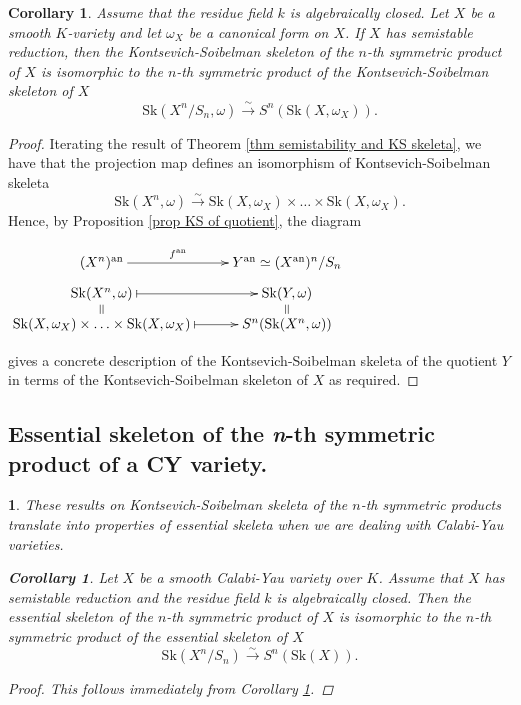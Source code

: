 \documentclass{amsart}%
\numberwithin{equation}{subsection}
\theoremstyle{plain2}
\newtheorem{cor}[equation]{Corollary}
\theoremstyle{definition2}
\theoremstyle{stepstyle}
\theoremstyle{point}
\theoremstyle{subpoint}
\newtheorem{subpoint}[equation]{}%
\newcommand{\spa}[1]{\begin{subpoint}#1\end{subpoint}}           %
\newcommand{\an}{\mathrm{an}}
\newcommand{\Sk}{\mathrm{Sk}}
\begin{document}
{\begin{cor}  \label{cor semistability and KS skeleta quotient}
Assume that the residue field $k$ is algebraically closed. Let $X$ be a smooth $K$-variety and let $\omega_X$ be a canonical form on $X$. If $X$ has semistable reduction, then the Kontsevich-Soibelman skeleton of the $n$-th symmetric product of $X$ is isomorphic to the $n$-th symmetric product of the Kontsevich-Soibelman skeleton of $X$ $$\Sk(X^n/S_n,\omega) \xrightarrow{\sim} S^n(\Sk(X,\omega_X)).$$
\end{cor}
\begin{proof}
Iterating the result of Theorem \ref{thm semistability and KS skeleta}, we have that the projection map defines an isomorphism of Kontsevich-Soibelman skeleta $$\Sk(X^n, \omega) \xrightarrow{\sim} \Sk(X,\omega_X) \times  \ldots \times \Sk(X,\omega_X).$$ Hence, by Proposition \ref{prop KS of quotient}, the diagram \begin{center}$
\xymatrixrowsep{0.5pc}\xymatrix{
(X^n)^\an \ar[r]^-{f^\an} & Y^\an \simeq (X^\an)^n/S_n \\
\Sk(X^n,\omega) \ar@{|->}[r] \ar@{=}[d] & \Sk(Y,\omega) \ar@{=}[d]  \\
\Sk(X,\omega_X) \times  \ldots \times \Sk(X,\omega_X) \ar@{|->}[r]& S^n (\Sk(X^n,\omega))\\
}
$
\end{center}gives a concrete description of the Kontsevich-Soibelman skeleta of the quotient $Y$ in terms of the Kontsevich-Soibelman skeleton of $X$ as required.
\end{proof}
}

\subsection{Essential skeleton of the \textit{n}-th symmetric product of a CY variety.}
\spa{These results on Kontsevich-Soibelman skeleta of the $n$-th symmetric products translate into properties of essential skeleta when we are dealing with Calabi-Yau varieties.

\begin{cor}  \label{cor semistability and essential skeleta quotient}
Let $X$ be a smooth Calabi-Yau variety over $K$. Assume that $X$ has semistable reduction and the residue field $k$ is algebraically closed. Then the essential skeleton of the $n$-th symmetric product of $X$ is isomorphic to the $n$-th symmetric product of the essential skeleton of $X$ $$\Sk(X^n/S_n) \xrightarrow{\sim} S^n(\Sk(X)).$$ 
\end{cor} 
\begin{proof}
This follows immediately from Corollary \ref{cor semistability and KS skeleta quotient}.
\end{proof}
}
\end{document}
